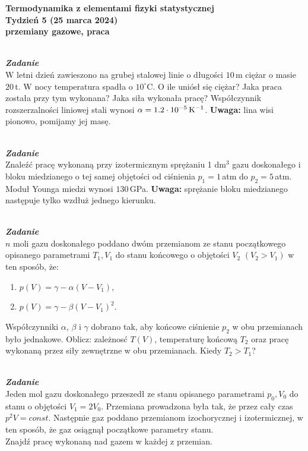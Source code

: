 \documentclass[11pt,a4paper]{article}
\newcounter{zadanie}\newcommand{\zadanie}[1][]{\addtocounter{zadanie}{1} ~\\  {\bf \emph{Zadanie \arabic{zadanie} #1 }} \\}
\renewcommand{\t}[1]{\textrm{#1}}
\begin{document}

\begin{centering}
\bf{\Large{Termodynamika z elementami fizyki statystycznej}}\\
Tydzień 5  (25 marca 2024)\\[3mm]
przemiany gazowe, praca \\
\end{centering}
\vspace{5mm}

\zadanie
W letni dzień zawieszono na grubej stalowej linie o długości $10\,$m ciężar o masie $20\,$t.
W nocy temperatura spadła o $10^\circ$C. O ile uniósł się ciężar?
Jaka praca została przy tym wykonana? Jaka siła wykonała pracę?
Współczynnik rozszerzalności liniowej stali wynosi $\alpha = 1.2\cdot 10^{-5}\,{\rm K}^{-1}$.
\vskip 10pt
\textbf{Uwaga: }lina wisi pionowo, pomijamy jej masę.


\zadanie
Znaleźć pracę wykonaną przy izotermicznym sprężaniu 1 dm$^3$
gazu doskonałego i bloku miedzianego o tej samej objętości od
ciśnienia $p_1=1\,$atm do $p_2=5\,$atm. Moduł Younga miedzi wynosi $130\,$GPa.
\vskip 10pt
\textbf{Uwaga:} sprężanie bloku miedzianego następuje tylko wzdłuż jednego kierunku.


\zadanie
$n$ moli gazu doskonałego poddano dwóm przemianom ze stanu początkowego
opisanego parametrami $T_1, V_1$ do stanu końcowego o objętości $V_2$
$(V_2>V_1)$ w ten
sposób, że:\begin{enumerate}
\item $p(V) = \gamma - \alpha (V-V_1)$,
\item $p(V) = \gamma - \beta (V-V_1)^2$.
\end{enumerate}
Współczynniki $\alpha$, $\beta$ i $\gamma$ dobrano tak,
aby końcowe ciśnienie $p_2$ w obu przemianach było jednakowe.
Oblicz: zależnosć $T(V)$, temperaturę końcową $T_2$
oraz pracę wykonaną przez siły zewnętrzne w obu przemianach.
Kiedy $T_2>T_1$?

\vskip 10pt


\zadanie
Jeden mol gazu doskonałego przeszedł ze stanu opisanego parametrami
$p_0, V_0$ do stanu o objętości $V_1 = 2 V_0$.
Przemiana prowadzona była tak, że przez cały czas $p^2 V = const$.
Następnie gaz poddano przemianom izochorycznej i izotermicznej, w ten sposób, że gaz osiągnął
początkowe parametry stanu. \\
Znajdź pracę wykonaną nad gazem w każdej z przemian.
\end{document}
